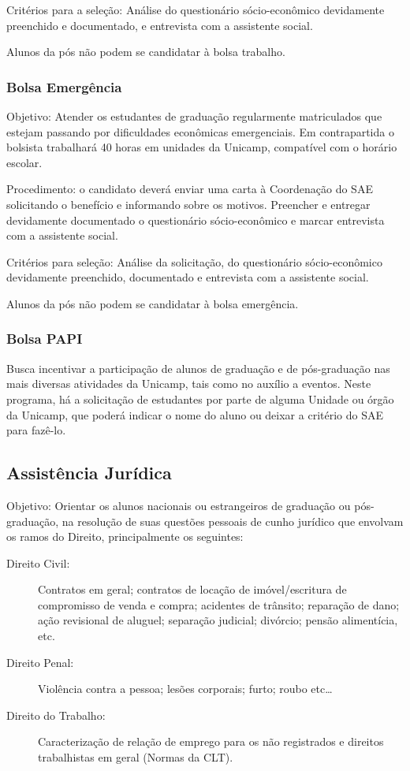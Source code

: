 Critérios para a seleção: Análise do questionário sócio-econômico devidamente
preenchido e documentado, e entrevista com a assistente social.

Alunos da pós não podem se candidatar à bolsa trabalho.

\subsubsection{Bolsa Emergência}

Objetivo: Atender os estudantes de graduação regularmente matriculados que
estejam passando por dificuldades econômicas emergenciais. Em contrapartida o
bolsista trabalhará 40 horas em unidades da Unicamp, compatível com o horário
escolar.

Procedimento: o candidato deverá enviar uma carta à Coordenação do SAE
solicitando o benefício e informando sobre os motivos. Preencher e entregar
devidamente documentado o questionário sócio-econômico e marcar entrevista com a
assistente social.

Critérios para seleção: Análise da solicitação, do questionário sócio-econômico
devidamente preenchido, documentado e entrevista com a assistente social.

Alunos da pós não podem se candidatar à bolsa emergência.

\subsubsection{Bolsa PAPI}

Busca incentivar a participação de alunos de graduação e de pós-graduação nas
mais diversas atividades da Unicamp, tais como no auxílio a eventos. Neste
programa, há a solicitação de estudantes por parte de alguma Unidade ou órgão da
Unicamp, que poderá indicar o nome do aluno ou deixar a critério do SAE para
fazê-lo.

\subsection{Assistência Jurídica}

Objetivo: Orientar os alunos nacionais ou estrangeiros de graduação ou
pós-graduação, na resolução de suas questões pessoais de cunho jurídico que
envolvam os ramos do Direito, principalmente os seguintes:

\begin{description}
    \item[Direito Civil:] Contratos em geral; contratos de locação de
        imóvel/escritura de compromisso de venda e compra; acidentes de
        trânsito; reparação de dano; ação revisional de aluguel; separação
        judicial; divórcio; pensão alimentícia, etc.

    \item[Direito Penal:] Violência contra a pessoa; lesões corporais; furto;
        roubo etc{\dots}

    \item[Direito do Trabalho:] Caracterização de relação de emprego para os não
        registrados e direitos trabalhistas em geral (Normas da CLT).
\end{description}

